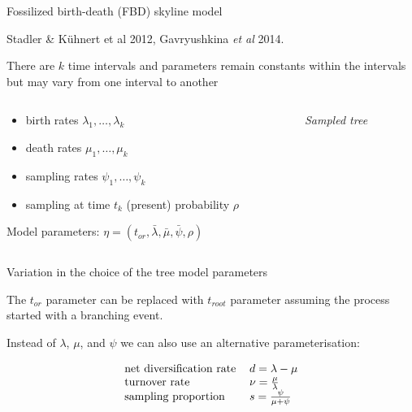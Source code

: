 \begin{frame} {Fossilized birth-death (FBD) skyline model}

Stadler \& K\"uhnert et al 2012, Gavryushkina {\it et al} 2014.

\vspace{0.2cm}

There are $k$ time intervals and parameters remain constants within the intervals but may vary from one interval to another

\begin{columns}[c]
\begin{column}{.5\textwidth}
\begin{itemize}
\item birth rates $\lambda_1, \ldots, \lambda_k$
\item death rates $\mu_1, \ldots, \mu_k$
\item sampling rates $\psi_1, \ldots, \psi_k$
\item sampling at time $t_k$ (present) probability $\rho$
\end{itemize}

\begin{center}
Model parameters:
\color{newblue1} $\eta = (t_{or}, \bar \lambda, \bar \mu, \bar \psi, \rho)$ 

\end{center}
  \end{column}
   \begin{column}{.5\textwidth}
\begin{center}

\end{center}
\begin{center}\emph{\small Sampled tree} \end{center}   
 \end{column}    
\end{columns}

\end{frame}



\iffalse 

\begin{frame}{Variation in the choice of the tree model parameters}

The $t_{or}$ parameter can be replaced with $t_{root}$ parameter assuming the process started with a branching event. 

\vskip2mm

Instead of $\lambda$, $\mu$, and $\psi$ we can also use an alternative parameterisation:

\renewcommand{\arraystretch}{1.2}

\begin{equation*} 
\begin{tabular}{ll} 
\text{net diversification rate} & $d = \lambda-\mu$  \\ 
\text{turnover rate} & $\turnover = \frac \mu \lambda$ \\ 
\text{\sampleprop} & $\fosp = \frac\psi {\mu + \psi}$  \\ 
\end{tabular} \end{equation*}

\end{frame}

